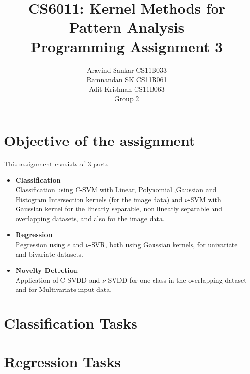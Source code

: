 \documentclass{article}
\begin{document}
\title{\textbf{CS6011: Kernel Methods for Pattern Analysis}
\\
\textbf{Programming Assignment 3}
}
\author{Aravind Sankar CS11B033 \\
Ramnandan SK CS11B061 \\
Adit Krishnan CS11B063 \\[0.2in]
Group 2
}
\maketitle
\tableofcontents 
\newpage
\section{Objective of the assignment}
This assignment consists of 3 parts. 
\begin{itemize}
\item \textbf{Classification} \\[5pt]
Classification using C-SVM with Linear, Polynomial ,Gaussian and Histogram Intersection kernels (for the image data) and $\nu$-SVM with Gaussian kernel for the linearly separable, non linearly separable and overlapping datasets, and also for the image data. \\[10pt]
\item \textbf{Regression} \\[5pt]
Regression using $\epsilon$ and $\nu$-SVR, both using Gaussian kernels, for univariate and bivariate datasets. \\[10pt]
\item \textbf{Novelty Detection}\\[5pt] 
Application of C-SVDD and $\nu$-SVDD for one class in the overlapping dataset and for Multivariate input data. \\[10pt]
\end{itemize}


\section{Classification Tasks}

\section{Regression Tasks}
\end{document}
